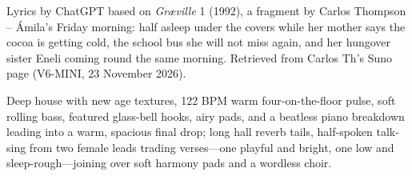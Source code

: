 
\begin{notes}
Lyrics by ChatGPT based on \emph{Gr\ae ville} 1 (1992), a fragment by Carlos Thompson -- Ámila's Friday morning: half asleep under the covers while her mother says the cocoa is getting cold, the school bus she will not miss again, and her hungover sister Eneli coming round the same morning. Retrieved from Carlos Th's Suno page (V6-MINI, 23 November 2026).
\end{notes}
\begin{style}
Deep house with new age textures, 122 BPM warm four-on-the-floor pulse, soft rolling bass, featured glass-bell hooks, airy pads, and a beatless piano breakdown leading into a warm, spacious final drop; long hall reverb tails, half-spoken talk-sing from two female leads trading verses—one playful and bright, one low and sleep-rough—joining over soft harmony pads and a wordless choir.
\end{style}

